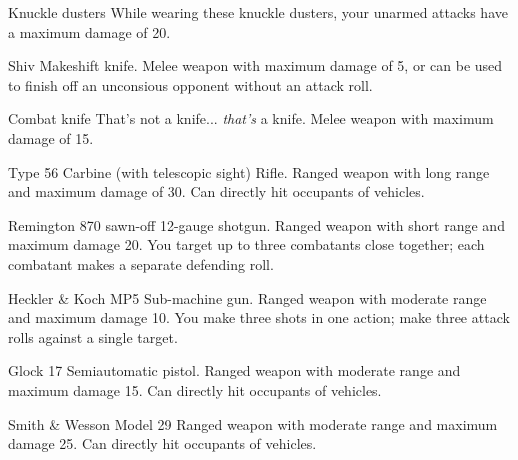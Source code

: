 
\begin{describe}{Knuckle dusters}
  While wearing these knuckle dusters, your unarmed attacks have a maximum damage of 20.
\end{describe}

\begin{describe}{Shiv}
  Makeshift knife. Melee weapon with maximum damage of 5, or can be used to finish off an unconsious opponent without an attack roll.
\end{describe}

\begin{describe}{Combat knife}
  That's not a knife... \emph{that's} a knife. Melee weapon with maximum damage of 15.
\end{describe}

\begin{describe}{Type 56 Carbine (with telescopic sight)}
  Rifle. Ranged weapon with long range and maximum damage of 30. Can directly hit occupants of vehicles.
\end{describe}

\begin{describe}{Remington 870 sawn-off}
  12-gauge shotgun. Ranged weapon with short range and maximum damage 20. You target up to three combatants close together; each combatant makes a separate defending roll.
\end{describe}

\begin{describe}{Heckler \& Koch MP5}
  Sub-machine gun. Ranged weapon with moderate range and maximum damage 10. You make three shots in one action; make three attack rolls against a single target.
\end{describe}

\begin{describe}{Glock 17}
  Semiautomatic pistol. Ranged weapon with moderate range and maximum damage 15. Can directly hit occupants of vehicles.
\end{describe}

\begin{describe}{Smith \& Wesson Model 29}
  Ranged weapon with moderate range and maximum damage 25. Can directly hit occupants of vehicles.
\end{describe}

